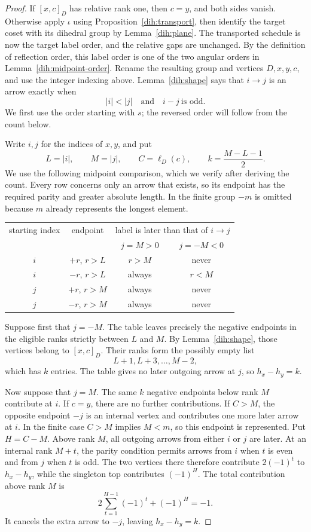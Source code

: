 \begin{proof}
If $[x,c]_D$ has relative rank one, then $c=y$, and both sides
vanish. Otherwise apply $\iota$ using Proposition~\ref{dih:transport}, then
identify the target coset with its dihedral group by Lemma~\ref{dih:plane}.
The transported schedule is now the target label order, and the relative
gaps are unchanged. By the definition of reflection order, this label order
is one of the two angular orders in Lemma~\ref{dih:midpoint-order}.
Rename the resulting group and vertices $D,x,y,c$, and use the integer
indexing above. Lemma~\ref{dih:shape} says that $i\to j$ is an arrow exactly
when
\[
 |i|<|j|\quad\text{and}\quad i-j\ \text{is odd}.
\]
We first use the order starting with $s$; the reversed order will follow
from the count below.

Write $i,j$ for the indices of $x,y$, and put
\[
 L=|i|,\qquad M=|j|,\qquad C=\ell_D(c),
 \qquad k=\frac{M-L-1}{2}.
\]
We use the following midpoint comparison, which we verify after deriving
the count.  Every row concerns only an arrow that exists, so its endpoint
has the required parity and greater absolute length.  In the finite group
$-m$ is omitted because $m$ already represents the longest element.
\begin{center}
\begin{tabular}{c|c|c|c}
starting index&endpoint&
\multicolumn{2}{c}{label is later than that of $i\to j$}
\\
&&$j=M>0$&$j=-M<0$\\ \hline
$i$&$+r$, $r>L$&$r>M$&never\\
$i$&$-r$, $r>L$&always&$r<M$\\
$j$&$+r$, $r>M$&always&never\\
$j$&$-r$, $r>M$&always&never
\end{tabular}
\end{center}
Suppose first that $j=-M$.  The table leaves precisely the negative
endpoints in the eligible ranks strictly between $L$ and $M$.
By Lemma~\ref{dih:shape}, those vertices belong to $[x,c]_D$.
Their ranks form the possibly empty list
\[
 L+1,L+3,\ldots,M-2,
\]
which has $k$ entries.  The table gives no later outgoing arrow at $j$,
so $h_x-h_y=k$.

Now suppose that $j=M$.  The same $k$ negative endpoints below rank $M$
contribute at $i$.  If $c=y$, there are no further contributions.
If $C>M$, the opposite endpoint $-j$ is an internal vertex and contributes
one more later arrow at $i$.  In the finite case $C>M$ implies $M<m$, so
this endpoint is represented.  Put $H=C-M$.  Above rank $M$, all outgoing
arrows from either $i$ or $j$ are later.  At an internal rank $M+t$, the
parity condition permits arrows from $i$ when $t$ is even and from $j$
when $t$ is odd.
The two vertices there therefore contribute $2(-1)^t$ to $h_x-h_y$, while
the singleton top contributes $(-1)^H$.  The total contribution above
rank $M$ is
\[
 2\sum_{t=1}^{H-1}(-1)^t+(-1)^H=-1.
\]
It cancels the extra arrow to $-j$, leaving $h_x-h_y=k$.


\end{proof}
